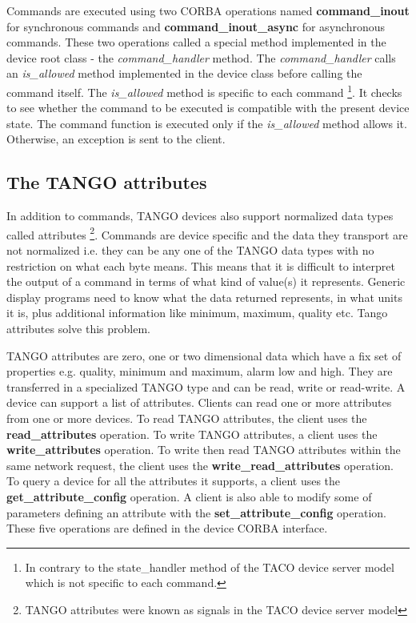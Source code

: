 Commands are executed using two CORBA operations named \textbf{command\_inout}
for synchronous commands and \textbf{command\_inout\_async}
for asynchronous commands. These two operations called a special method
implemented in the device root class - the \emph{command\_handler}
method. The \emph{command\_handler} calls an \emph{is\_allowed}
method implemented in the device class before calling the command
itself. The \emph{is\_allowed} method is specific to each command%
\footnote{In contrary to the state\_handler method of the TACO device server
model which is not specific to each command.%
}. It checks to see whether the command to be executed is compatible
with the present device state. The command function is executed only
if the \emph{is\_allowed} method allows it. Otherwise, an exception
is sent to the client.


\subsection{The TANGO attributes}

In addition to commands, TANGO devices also support normalized data
types called attributes%
\footnote{TANGO attributes were known as signals in the TACO device server model%
}. Commands are device specific and the data they transport are not
normalized i.e. they can be any one of the TANGO data types with no
restriction on what each byte means. This means that it is difficult
to interpret the output of a command in terms of what
kind of value(s) it represents. Generic display programs need to know
what the data returned represents, in what units it is, plus additional
information like minimum, maximum, quality etc. Tango attributes solve
this problem.

TANGO attributes are zero, one or two dimensional data which have
a fix set of properties e.g. quality, minimum and maximum, alarm low
and high. They are transferred in a specialized TANGO type and can
be read, write or read-write. A device can support a list of attributes.
Clients can read one or more attributes from one or more devices.
To read TANGO attributes, the client uses the \textbf{read\_attributes}
operation. To write TANGO attributes, a client uses the \textbf{write\_attributes}
operation. To write then read TANGO attributes within the same network
request, the client uses the \textbf{write\_read\_attributes}
operation. To query a device for all the attributes it supports, a
client uses the \textbf{get\_attribute\_config}
operation. A client is also able to modify some of parameters defining
an attribute with the \textbf{set\_attribute\_config}
operation. These five operations are defined in the device CORBA interface.

